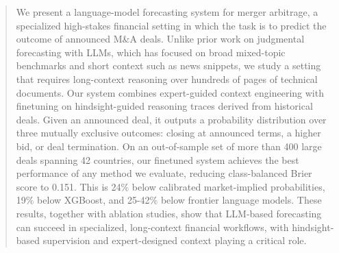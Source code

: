 \documentclass{article}
\theoremstyle{plain}
\theoremstyle{definition}
\theoremstyle{remark}
\begin{document}


\printAffiliationsAndNotice{}  %

\begin{abstract}


We present a language-model forecasting system for merger arbitrage, a specialized high-stakes financial setting in which the task is to predict the outcome of announced M\&A deals. Unlike prior work on judgmental forecasting with LLMs, which has focused on broad mixed-topic benchmarks and short context such as news snippets, we study a setting that requires long-context reasoning over hundreds of pages of technical documents. Our system combines expert-guided context engineering with finetuning on hindsight-guided reasoning traces derived from historical deals. Given an announced deal, it outputs a probability distribution over three mutually exclusive outcomes: closing at announced terms, a higher bid, or deal termination. 
On an out-of-sample set of more than 400 large deals spanning 42 countries, our finetuned system achieves the best performance of any method we evaluate, reducing class-balanced Brier score to 0.151. This is 24\% below calibrated market-implied probabilities, 19\% below XGBoost, and 25-42\% below frontier language models.
These results, together with ablation studies, show that LLM-based forecasting can succeed in specialized, long-context financial workflows, with hindsight-based supervision and expert-designed context playing a critical role.




\end{abstract}
\end{document}
